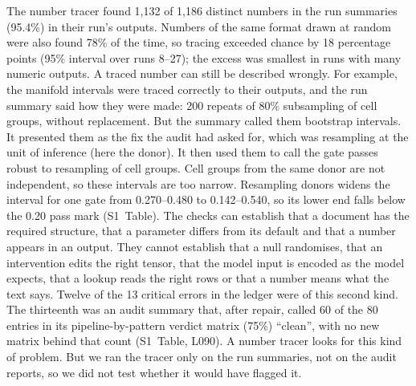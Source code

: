 The number tracer found 1,132 of 1,186 distinct numbers in the run
summaries (95.4\%) in their run's outputs. Numbers of the same format
drawn at random were also found 78\% of the time, so tracing exceeded
chance by 18 percentage points (95\% interval over runs 8--27); the
excess was smallest in runs with many numeric outputs. A traced number
can still be described wrongly. For example, the manifold intervals were
traced correctly to their outputs, and the run summary said how they were
made: 200 repeats of 80\% subsampling of cell groups, without
replacement. But the summary called them bootstrap intervals. It presented them as the
fix the audit had asked for, which was resampling at the unit of inference
(here the donor). It then used them to call the gate passes robust to
resampling of cell groups. Cell groups
from the same donor are not independent, so these intervals are too
narrow. Resampling donors widens the interval for one gate from
0.270--0.480 to 0.142--0.540, so its lower end falls below the 0.20 pass
mark (S1~Table). The checks
can establish that a document has the required structure, that a
parameter differs from its default and that a number appears in an
output. They cannot establish that a null randomises, that an
intervention edits the right tensor, that the model input is encoded as
the model expects, that a lookup reads the right rows or that a number
means what the text says. Twelve of the 13 critical errors in the ledger
were of this second kind. The thirteenth was an audit summary that,
after repair, called 60 of the 80 entries in its pipeline-by-pattern
verdict matrix (75\%) ``clean'', with no new matrix behind that count
(S1~Table, L090). A number tracer looks for this kind of problem. But we
ran the tracer only on the run summaries, not on the audit reports, so we
did not test whether it would have flagged it.
